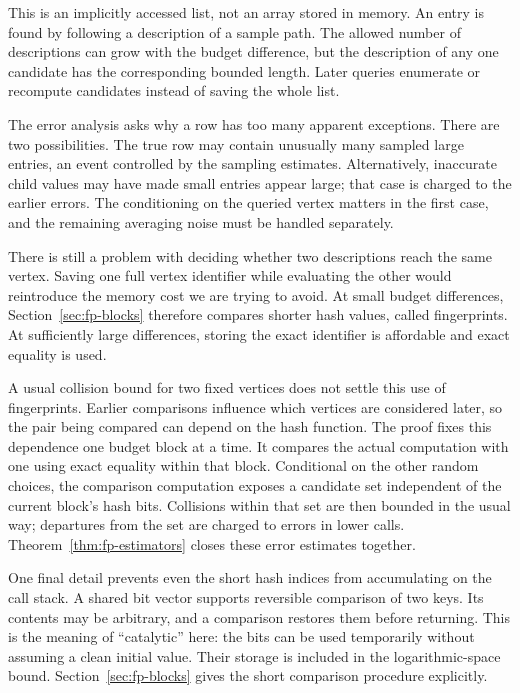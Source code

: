 This is an implicitly accessed list, not an array stored in memory. An entry is found by following a description of a sample path. The allowed number of descriptions can grow with the budget difference, but the description of any one candidate has the corresponding bounded length. Later queries enumerate or recompute candidates instead of saving the whole list.

The error analysis asks why a row has too many apparent exceptions. There are two possibilities. The true row may contain unusually many sampled large entries, an event controlled by the sampling estimates. Alternatively, inaccurate child values may have made small entries appear large; that case is charged to the earlier errors. The conditioning on the queried vertex matters in the first case, and the remaining averaging noise must be handled separately.

There is still a problem with deciding whether two descriptions reach the same vertex. Saving one full vertex identifier while evaluating the other would reintroduce the memory cost we are trying to avoid. At small budget differences, Section~\ref{sec:fp-blocks} therefore compares shorter hash values, called fingerprints. At sufficiently large differences, storing the exact identifier is affordable and exact equality is used.

A usual collision bound for two fixed vertices does not settle this use of fingerprints. Earlier comparisons influence which vertices are considered later, so the pair being compared can depend on the hash function. The proof fixes this dependence one budget block at a time. It compares the actual computation with one using exact equality within that block. Conditional on the other random choices, the comparison computation exposes a candidate set independent of the current block's hash bits. Collisions within that set are then bounded in the usual way; departures from the set are charged to errors in lower calls. Theorem~\ref{thm:fp-estimators} closes these error estimates together.

One final detail prevents even the short hash indices from accumulating on the call stack. A shared bit vector supports reversible comparison of two keys. Its contents may be arbitrary, and a comparison restores them before returning. This is the meaning of ``catalytic'' here: the bits can be used temporarily without assuming a clean initial value. Their storage is included in the logarithmic-space bound. Section~\ref{sec:fp-blocks} gives the short comparison procedure explicitly.

